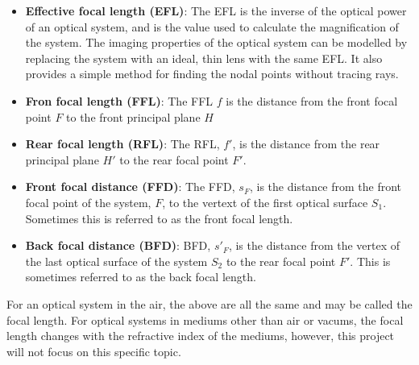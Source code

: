 \begin{itemize}
    \item \textbf{Effective focal length (EFL)}: The EFL is the inverse of the optical power of an optical system, and is the value used to calculate the magnification of the system. The imaging properties of the optical system can be modelled by replacing the system with an ideal, thin lens with the same EFL. It also provides a simple method for finding the nodal points without tracing rays.
    \item \textbf{Fron focal length (FFL)}: The FFL $f$ is the distance from the front focal point $F$ to the front principal plane $H$
    \item \textbf{Rear focal length (RFL)}: The RFL, $f'$, is the distance from the rear principal plane $H'$ to the rear focal point $F'$.
    \item \textbf{Front focal distance (FFD)}: The FFD, $s_F$, is the distance from the front focal point of the system, $F$, to the vertext of the first optical surface $S_1$. Sometimes this is referred to as the front focal length.
    \item \textbf{Back focal distance (BFD)}: BFD, $s'_F$, is the distance from the vertex of the last optical surface of the system $S_2$ to the rear focal point $F'$. This is sometimes referred to as the back focal length.
\end{itemize}
For an optical system in the air, the above are all the same and may be called the focal length.
\nl
For optical systems in mediums other than air or vacums, the focal length changes with the refractive index of the mediums, however, this project will not focus on this specific topic.

